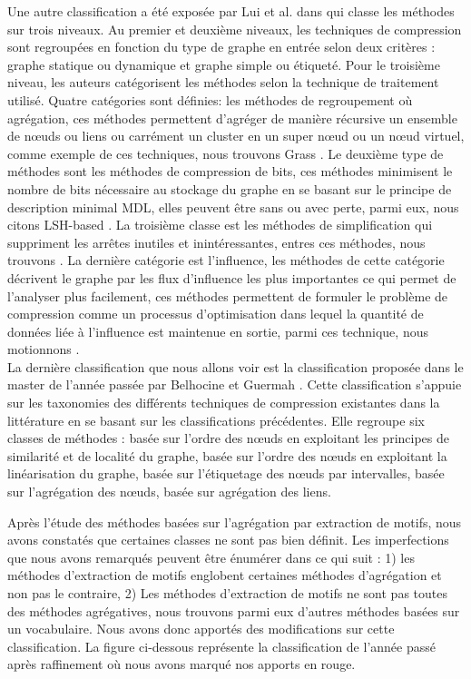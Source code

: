 Une autre classification a été exposée par Lui et al. dans \citep{liu2018graph} qui classe les méthodes sur trois niveaux. Au premier et deuxième niveaux, les techniques de compression sont regroupées en fonction du type de graphe en entrée selon deux critères : graphe statique ou dynamique et graphe simple ou étiqueté. Pour le troisième niveau, les auteurs catégorisent les méthodes selon la technique de traitement utilisé. Quatre catégories sont définies: les méthodes de regroupement où agrégation, ces méthodes permettent d'agréger de manière récursive un ensemble de nœuds ou liens ou carrément un cluster en un super nœud ou un nœud virtuel, comme exemple de ces techniques, nous trouvons Grass \citep{lefevre2010grass}. Le deuxième type de méthodes sont les méthodes de compression de bits, ces méthodes minimisent le nombre de bits nécessaire au stockage du graphe en se basant sur le principe de description minimal MDL, elles peuvent être sans ou avec perte, parmi eux, nous citons LSH-based \citep{khan2014set}. La troisième classe est les méthodes de simplification qui suppriment les arrêtes inutiles et inintéressantes, entres ces méthodes, nous trouvons \citep{shen2006visual}. La dernière catégorie est l'influence, les méthodes de cette catégorie décrivent le graphe par les flux d'influence les plus importantes ce qui permet de l'analyser plus facilement, ces méthodes permettent de formuler le problème de compression comme un processus d'optimisation dans lequel la quantité de données liée à l'influence est maintenue en sortie, parmi ces technique, nous motionnons \citep{shi2015vegas}.\\


La dernière classification que nous allons voir est la classification proposée dans le master de l'année passée par Belhocine et Guermah \citep{master2017}. Cette classification s'appuie sur les taxonomies des différents techniques de compression existantes dans la littérature en se basant sur les classifications précédentes. Elle regroupe six classes de méthodes :  basée sur l'ordre des nœuds en exploitant les principes de similarité et de localité du graphe, basée sur l'ordre des nœuds en exploitant la linéarisation du graphe, basée sur l'étiquetage des nœuds par intervalles, basée sur l'agrégation des nœuds, basée sur agrégation des liens. 

Après l'étude des méthodes basées sur l'agrégation par extraction de motifs, nous avons constatés que certaines classes ne sont pas bien définit. Les imperfections que nous avons remarqués peuvent être énumérer dans ce qui suit : 1) les méthodes d'extraction de motifs englobent certaines méthodes d'agrégation et non pas le contraire, 2) Les méthodes d'extraction de motifs ne sont pas toutes des méthodes agrégatives, nous trouvons parmi eux d'autres méthodes basées sur un vocabulaire. Nous avons donc apportés des modifications sur cette classification. La figure ci-dessous représente la classification de l'année passé après raffinement où nous avons marqué nos apports en rouge.

